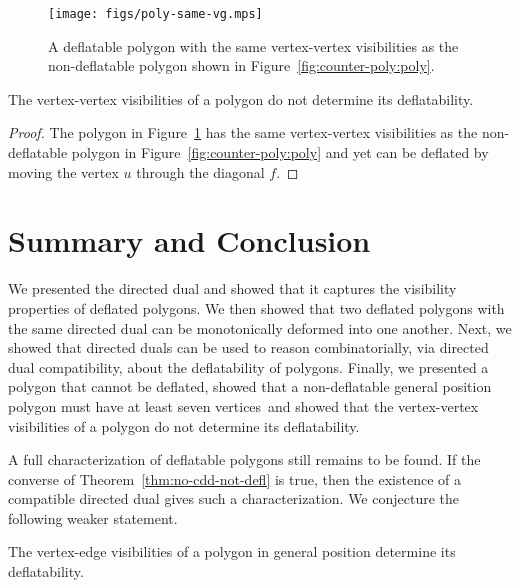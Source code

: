 \documentclass{patmorin}
\begin{document}
\fi


\begin{figure}[htb]
  \centering
  \texttt{[image: figs/poly-same-vg.mps]}
  \caption{A deflatable polygon with the same vertex-vertex
    visibilities as the non-deflatable polygon shown in
    Figure~\ref{fig:counter-poly:poly}.}
  \label{fig:def-poly-same-vis}
\end{figure}

\begin{theorem}
  The vertex-vertex visibilities of a polygon do not determine its
  deflatability.
\end{theorem}
\begin{proof}
  The polygon in Figure~\ref{fig:def-poly-same-vis} has the same
  vertex-vertex visibilities as the non-deflatable polygon in
  Figure~\ref{fig:counter-poly:poly} and yet can be deflated by moving
  the vertex $u$ through the diagonal $f$.
\end{proof}


\section{Summary and Conclusion}

We presented the directed dual and showed that it captures the
visibility properties of deflated polygons.  We then showed that two
deflated polygons with the same directed dual can be monotonically
deformed into one another.  Next, we showed that directed duals can be
used to reason combinatorially, via directed dual compatibility, about
the deflatability of polygons.  Finally, we presented a polygon that
cannot be deflated\iffullversion , showed that a non-deflatable
general position polygon must have at least seven vertices\fi\ and
showed that the vertex-vertex visibilities of a polygon do not
determine its deflatability.

A full characterization of deflatable polygons still remains to be
found.  If the converse of Theorem~\ref{thm:no-cdd-not-defl} is true,
then the existence of a compatible directed dual gives such a
characterization.  We conjecture the following weaker statement.

\begin{conj}
  The vertex-edge visibilities of a polygon in general position
  determine its deflatability.
\end{conj}
\end{document}

